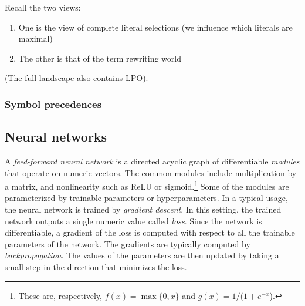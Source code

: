 Recall the two views:
\begin{enumerate}
\item
	One is the view of complete literal selections (we influence which literals are maximal)

\item
	The other is that of the term rewriting world

\end{enumerate}
(The full landscape also contains LPO).




\subsubsection{Symbol precedences}


\subsection{Neural networks}

A \emph{feed-forward neural network} is a directed acyclic graph
of differentiable \emph{modules} that operate on numeric vectors.
The common modules include multiplication by a matrix, and nonlinearity such as ReLU or sigmoid.\footnote{
These are, respectively, $f(x) = \max\{0,x\}$ and $g(x) = 1/(1+e^{-x}$). }
Some of the modules are parameterized by trainable parameters or hyperparameters.
In a typical usage, the neural network is trained by \emph{gradient descent}.
In this setting, the trained network outputs a single numeric value called \emph{loss}.
Since the network is differentiable,
a gradient of the loss is computed with respect to all the trainable parameters of the network.
The gradients are typically computed by \emph{backpropagation}.
The values of the parameters are then updated by taking a small step in the direction that minimizes the loss.

